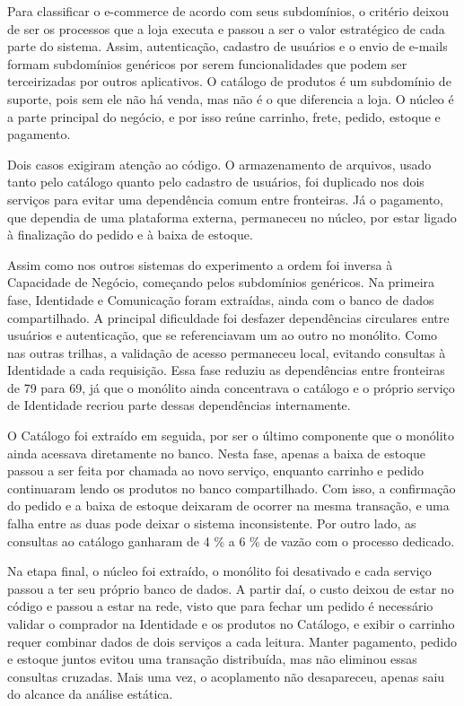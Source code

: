 Para classificar o e-commerce de acordo com seus subdomínios, o critério deixou de ser os processos que a loja executa e passou a ser o valor estratégico de cada parte do sistema. Assim, autenticação, cadastro de usuários e o envio de e-mails formam subdomínios genéricos por serem funcionalidades que podem ser terceirizadas por outros aplicativos. O catálogo de produtos é um subdomínio de suporte, pois sem ele não há venda, mas não é o que diferencia a loja. O núcleo é a parte principal do negócio, e por isso reúne carrinho, frete, pedido, estoque e pagamento.

Dois casos exigiram atenção ao código. O armazenamento de arquivos, usado tanto pelo catálogo quanto pelo cadastro de usuários, foi duplicado nos dois serviços para evitar uma dependência comum entre fronteiras. Já o pagamento, que dependia de uma plataforma externa, permaneceu no núcleo, por estar ligado à finalização do pedido e à baixa de estoque.

Assim como nos outros sistemas do experimento a ordem foi inversa à Capacidade de Negócio, começando pelos subdomínios genéricos. Na primeira fase, Identidade e Comunicação foram extraídas, ainda com o banco de dados compartilhado. A principal dificuldade foi desfazer dependências circulares entre usuários e autenticação, que se referenciavam um ao outro no monólito. Como nas outras trilhas, a validação de acesso permaneceu local, evitando consultas à Identidade a cada requisição. Essa fase reduziu as dependências entre fronteiras de 79 para 69, já que o monólito ainda concentrava o catálogo e o próprio serviço de Identidade recriou parte dessas dependências internamente.

O Catálogo foi extraído em seguida, por ser o último componente que o monólito ainda acessava diretamente no banco. Nesta fase, apenas a baixa de estoque passou a ser feita por chamada ao novo serviço, enquanto carrinho e pedido continuaram lendo os produtos no banco compartilhado. Com isso, a confirmação do pedido e a baixa de estoque deixaram de ocorrer na mesma transação, e uma falha entre as duas pode deixar o sistema inconsistente. Por outro lado, as consultas ao catálogo ganharam de 4 \% a 6 \% de vazão com o processo dedicado.

Na etapa final, o núcleo foi extraído, o monólito foi desativado e cada serviço passou a ter seu próprio banco de dados. A partir daí, o custo deixou de estar no código e passou a estar na rede, visto que para fechar um pedido é necessário validar o comprador na Identidade e os produtos no Catálogo, e exibir o carrinho requer combinar dados de dois serviços a cada leitura. Manter pagamento, pedido e estoque juntos evitou uma transação distribuída, mas não eliminou essas consultas cruzadas. Mais uma vez, o acoplamento não desapareceu, apenas saiu do alcance da análise estática.

